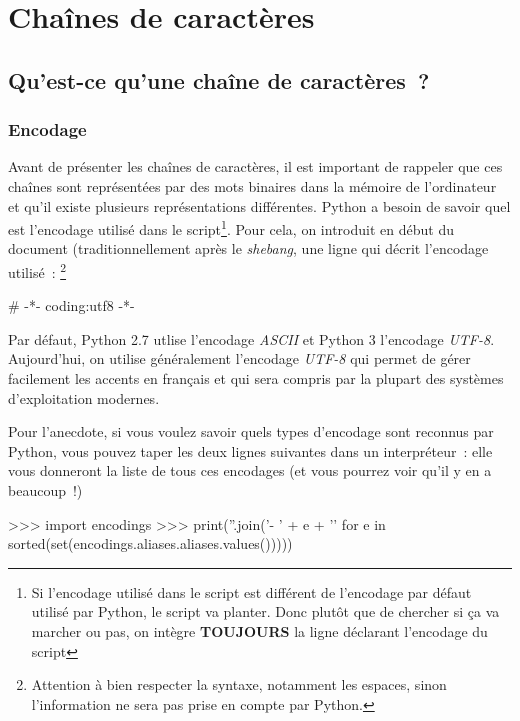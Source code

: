 
\chapter{Chaînes de caractères}
\label{python:caracteres}

\section{Qu'est-ce qu'une chaîne de caractères~?}
\subsection{Encodage}

Avant de présenter les chaînes de caractères, il est important de rappeler que ces chaînes sont représentées par des mots binaires dans la mémoire de l'ordinateur et qu'il existe plusieurs représentations différentes. Python a besoin de savoir quel est l'encodage utilisé dans le script\footnote{Si l'encodage utilisé dans le script est différent de l'encodage par défaut utilisé par Python, le script va planter. Donc plutôt que de chercher si ça va marcher ou pas, on intègre \textbf{TOUJOURS} la ligne déclarant l'encodage du script}. Pour cela, on introduit en début du document (traditionnellement après le \textit{shebang}, une ligne qui décrit l'encodage utilisé~:
\footnote{Attention à bien respecter la syntaxe, notamment les espaces, sinon l'information ne sera pas prise en compte par Python.}

\begin{pythoncode}
# -*- coding:utf8 -*-
\end{pythoncode}

Par défaut, Python 2.7 utlise l'encodage \textit{ASCII} et Python 3 l'encodage \textit{UTF-8}. Aujourd'hui, on utilise généralement l'encodage \textit{UTF-8} qui permet de gérer facilement les accents en français et qui sera compris par la plupart des systèmes d'exploitation modernes.

Pour l'anecdote, si vous voulez savoir quels types d'encodage sont reconnus par Python, vous pouvez taper les deux lignes suivantes dans un interpréteur~: elle vous donneront la liste de tous ces encodages (et vous pourrez voir qu'il y en a beaucoup~!)

\begin{pythoncode}
>>> import encodings
>>> print(''.join('- ' + e + '\n' for e in sorted(set(encodings.aliases.aliases.values()))))
\end{pythoncode}

